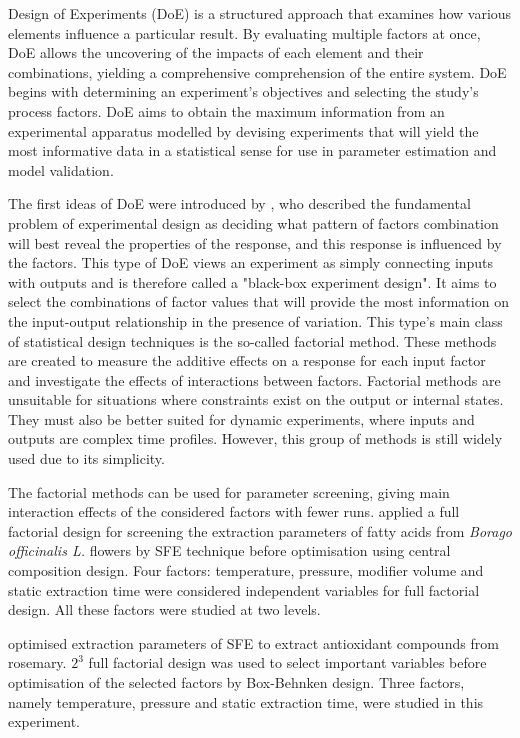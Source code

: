 \documentclass[../Article_Sensitivity_Analsysis.tex]{subfiles}
\begin{document}
	
	Design of Experiments (DoE) is a structured approach that examines how various elements influence a particular result. By evaluating multiple factors at once, DoE allows the uncovering of the impacts of each element and their combinations, yielding a comprehensive comprehension of the entire system. DoE begins with determining an experiment's objectives and selecting the study's process factors. DoE aims to obtain the maximum information from an experimental apparatus modelled by devising experiments that will yield the most informative data in a statistical sense for use in parameter estimation and model validation. 
	
	The first ideas of DoE were introduced by \citet{Fisher1935}, who described the fundamental problem of experimental design as deciding what pattern of factors combination will best reveal the properties of the response, and this response is influenced by the factors. This type of DoE views an experiment as simply connecting inputs with outputs and is therefore called a "black-box experiment design". It aims to select the combinations of factor values that will provide the most information on the input-output relationship in the presence of variation. This type's main class of statistical design techniques is the so-called factorial method. These methods are created to measure the additive effects on a response for each input factor and investigate the effects of interactions between factors. Factorial methods are unsuitable for situations where constraints exist on the output or internal states. They must also be better suited for dynamic experiments, where inputs and outputs are complex time profiles. However, this group of methods is still widely used due to its simplicity.
	
	The factorial methods can be used for parameter screening, giving main interaction effects of the considered factors with fewer runs. \citet{Ramandi2011} applied a full factorial design for screening the extraction parameters of fatty acids from \textit{Borago officinalis L.} flowers by SFE technique before optimisation using central composition design. Four factors: temperature, pressure, modifier volume and static extraction time were considered independent variables for full factorial design. All these factors were studied at two levels. 
	
	\citet{Caldera2012} optimised extraction parameters of SFE to extract antioxidant compounds from rosemary. $2^3$ full factorial design was used to select important variables before optimisation of the selected factors by Box-Behnken design. Three factors, namely temperature, pressure and static extraction time, were studied in this experiment.
	
\end{document}
